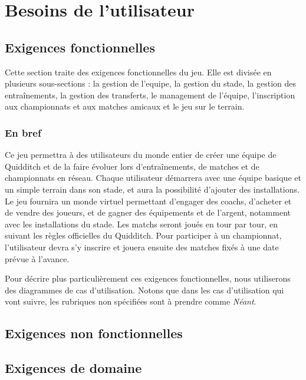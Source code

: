 \documentclass[a4paper, 11pt]{report}
\begin{document}
\chapter{Besoins de l'utilisateur}

\section{Exigences fonctionnelles}
Cette section traite des exigences fonctionnelles du jeu. Elle est divisée en 
plusieurs sous-sections : la gestion de l'\gls{equipe}, la gestion du 
stade, la gestion des entraînements, la gestion des transferts, le management de l'équipe, l'inscription aux championnats et aux matches amicaux et le jeu sur le terrain.

\subsection{En bref}
Ce jeu permettra à des utilisateurs du monde entier de créer une équipe de 
Quidditch et de la faire évoluer lors d'entraînements, de matches et de 
championnats en réseau. Chaque utilisateur démarrera avec une équipe basique et 
un simple terrain dans son stade, et aura la possibilité d'ajouter des 
installations.
Le jeu fournira un monde virtuel permettant d'engager des \gls{coach}s, d'acheter et de vendre des \gls{joueur}s, 
et de gagner des équipements et de l'argent, notamment avec les 
installations du stade.
Les matchs seront joués en tour par tour, en suivant les règles officielles 
du Quidditch.
Pour participer à un championnat, l'utilisateur devra s'y inscrire et 
jouera ensuite des matches fixés à une date prévue à l'avance.

Pour décrire plus particulièrement ces exigences fonctionnelles, nous utiliserons des diagrammes de \gls{cas d'utilisation}. Notons que dans les cas d'utilisation qui vont suivre, les rubriques non spécifiées sont à prendre comme \textit{Néant}.

\setcounter{secnumdepth}{3}





\section{Exigences non fonctionnelles}



\section{Exigences de domaine}

\end{document}
